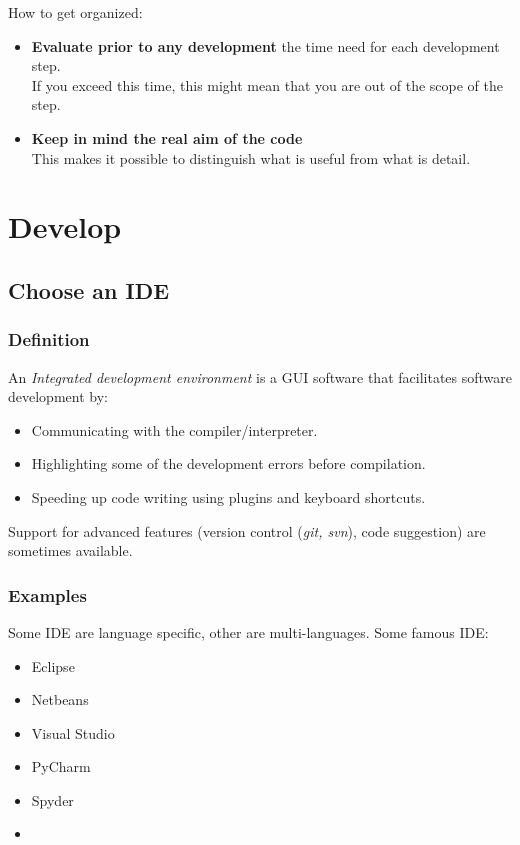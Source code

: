 \documentclass[11pt]{article}
\begin{document}
			How to get organized:
			\begin{itemize}
				\item \textbf{Evaluate prior to any development} the time need for each development step. \\
				If you exceed this time, this might mean that you are out of the scope of the step.
				\item \textbf{Keep in mind the real aim of the code} \\
                This makes it possible to distinguish what is useful from what is detail.
			\end{itemize}


	\section{Develop}
		\label{sec:dev}

		\subsection{Choose an IDE}

			\subsubsection{Definition}
				An \textit{Integrated development environment} is a GUI software that facilitates software development by:
				\begin{itemize}
					\item Communicating with the compiler/interpreter.
					\item Highlighting some of the development errors before compilation.
					\item Speeding up code writing using plugins and keyboard shortcuts.
				\end{itemize}
				Support for advanced features (version control (\textit{git, svn}), code suggestion) are sometimes available.

			\subsubsection{Examples}
				Some IDE are language specific, other are multi-languages. Some famous IDE:
				\begin{multicols}{3}
					\begin{itemize}
						\centering
						\item Eclipse
						\item Netbeans
						\item Visual Studio
						\item PyCharm
						\item Spyder
						\item[\vspace{\fill}]
					\end{itemize}
				\end{multicols}
\end{document}
